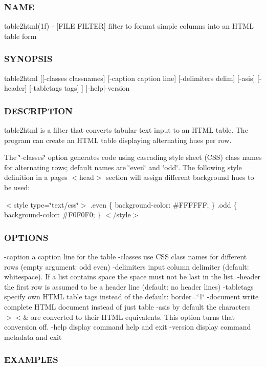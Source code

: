 \subsubsection*{N\+A\+ME}

table2html(1f) -\/ \mbox{[}F\+I\+LE F\+I\+L\+T\+ER\mbox{]} filter to format simple columns into an H\+T\+ML table form 

\subsubsection*{S\+Y\+N\+O\+P\+S\+IS}

\begin{DoxyVerb}table2html [[-classes classnames] [-caption caption line] [-delimiters delim]
           [-asis] [-header] [-tabletags tags] ] |-help|-version
\end{DoxyVerb}


\subsubsection*{D\+E\+S\+C\+R\+I\+P\+T\+I\+ON}

table2html is a filter that converts tabular text input to an H\+T\+ML table. The program can create an H\+T\+ML table displaying alternating hues per row.

The \char`\"{}-\/classes\char`\"{} option generates code using cascading style sheet (C\+SS) class names for alternating rows; default names are \char`\"{}even\char`\"{} and \char`\"{}odd\char`\"{}. The following style definition in a page\textquotesingle{}s $<$head$>$ section will assign different background hues to be used\+:

$<$style type=\char`\"{}text/css\char`\"{}$>$ .even \{ background-\/color\+: \#\+F\+F\+F\+F\+FF; \} .odd \{ background-\/color\+: \#\+F0\+F0\+F0; \} $<$/style$>$

\subsubsection*{O\+P\+T\+I\+O\+NS}

-\/caption a caption line for the table -\/classes use C\+SS class names for different rows (empty argument\+: odd even) -\/delimiters input column delimiter (default\+: whitespace). If a list contains space the space must not be last in the list. -\/header the first row is assumed to be a header line (default\+: no header lines) -\/tabletags specify own H\+T\+ML table tags instead of the default\+: border=\char`\"{}1\char`\"{} -\/document write complete H\+T\+ML document instead of just table -\/asis by default the characters $>$$<$\& are converted to their H\+T\+ML equivalents. This option turns that conversion off. -\/help display command help and exit -\/version display command metadata and exit \subsubsection*{E\+X\+A\+M\+P\+L\+ES}

